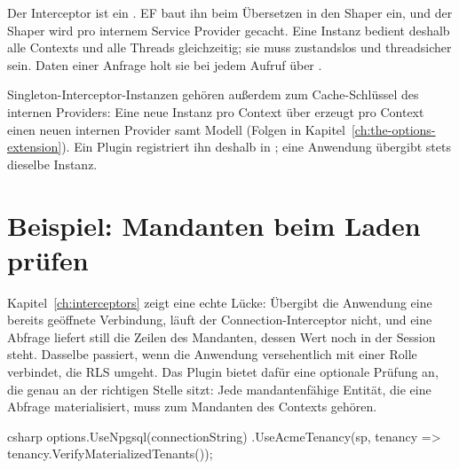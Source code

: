 \begin{important}
  Der Interceptor ist ein . EF baut ihn beim
  Übersetzen in den Shaper ein, und der Shaper wird pro internem Service Provider gecacht.
  Eine Instanz bedient deshalb alle Contexts und alle Threads gleichzeitig; sie muss
  zustandslos und threadsicher sein. Daten einer Anfrage holt sie bei jedem Aufruf über
  .

  Singleton-Interceptor-Instanzen gehören außerdem zum Cache-Schlüssel des internen
  Providers: Eine neue Instanz pro Context über  erzeugt
  pro Context einen neuen internen Provider samt Modell (Folgen in
  Kapitel~\ref{ch:the-options-extension}). Ein Plugin registriert ihn deshalb in
  ; eine Anwendung übergibt stets dieselbe Instanz.
\end{important}

\section{Beispiel: Mandanten beim Laden prüfen}

Kapitel~\ref{ch:interceptors} zeigt eine echte Lücke: Übergibt die Anwendung eine bereits
geöffnete Verbindung, läuft der Connection-Interceptor nicht, und eine Abfrage liefert still
die Zeilen des Mandanten, dessen Wert noch in der Session steht. Dasselbe passiert, wenn die
Anwendung versehentlich mit einer Rolle verbindet, die RLS umgeht. Das Plugin bietet dafür
eine optionale Prüfung an, die genau an der richtigen Stelle sitzt: Jede mandantenfähige
Entität, die eine Abfrage materialisiert, muss zum Mandanten des Contexts gehören.

\begin{sourcecode}[Anwendung]{csharp}
options.UseNpgsql(connectionString)
       .UseAcmeTenancy(sp, tenancy => tenancy.VerifyMaterializedTenants());
\end{sourcecode}

